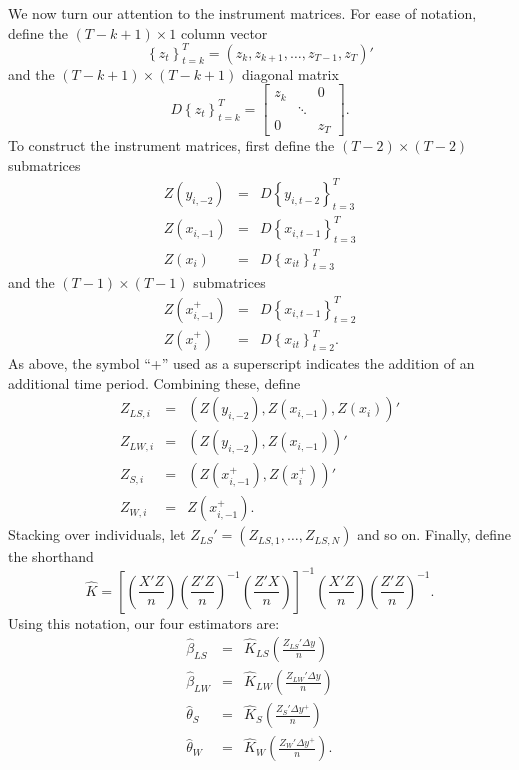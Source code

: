 We now turn our attention to the instrument matrices. For ease of notation, define the $(T-k+1)\times 1$ column vector
	\begin{equation}
		\left\{ z_t\right\}_{t=k}^{T} = \left(z_k, z_{k+1}, \hdots, z_{T-1}, z_T \right)'
	\end{equation}
and the $(T-k+1)\times (T-k+1)$ diagonal matrix
\begin{equation}
		D\left\{ z_t \right\}_{t=k}^{T} = \left[\begin{array}{ccc} z_{k} & & 0\\ &\ddots&\\ 0 &&z_T \end{array}\right].
\end{equation}
To construct the instrument matrices, first define the $(T-2)\times(T-2)$ submatrices
\begin{eqnarray}
	Z(y_{i,-2}) &=& D\left\{ y_{i,t-2} \right\}_{t=3}^{T}\\
	Z(x_{i,-1}) &=& D\left\{ x_{i,t-1} \right\}_{t=3}^{T}\\
	\label{eq:Zx}
		Z(x_i) &=& D\left\{x_{it}  \right\}_{t=3}^{T}
 \end{eqnarray}
and the $(T-1)\times(T-1)$ submatrices
\begin{eqnarray}
	Z(x_{i,-1}^+) &=&D\left\{ x_{i,t-1} \right\}_{t=2}^{T}\\
		Z(x_i^+) &=& D\left\{x_{it}  \right\}_{t=2}^{T}.
 \end{eqnarray}
As above, the symbol ``+'' used as a superscript indicates the addition of an additional time period. 
Combining these, define 
	\begin{eqnarray}
	Z_{LS,i} &=& \left(Z(y_{i,-2}), Z(x_{i,-1}), Z(x_i)  \right)'\\
	Z_{LW,i} &=&  \left(Z(y_{i,-2}), Z(x_{i,-1}) \right)'\\
	Z_{S,i} &=& \left(Z(x_{i,-1}^+), Z(x_i^+) \right)'\\
	Z_{W,i} &=& Z(x_{i,-1}^+).
	\end{eqnarray}
Stacking over individuals, let $Z_{LS}' = \left(Z_{LS,1}, \hdots,  Z_{LS,N}\right)$ and so on. 
Finally, define the shorthand
\begin{equation}
\label{eq:K}
	\widehat{K} = \left[\left(\frac{X'Z}{n}\right)\left(\frac{Z'Z}{n}\right)^{-1}\left(\frac{Z'X}{n}\right)\right]^{-1}\left(\frac{X'Z}{n}\right)\left(\frac{Z'Z}{n}\right)^{-1}.
\end{equation}
Using this notation, our four estimators are:
\begin{eqnarray}
	\widehat{\beta}_{LS} &=&  \widehat{K}_{LS}\left(\frac{Z_{LS}'\Delta y}{n}\right)\\
	\widehat{\beta}_{LW} &=& \widehat{K}_{LW}\left(\frac{Z_{LW}'\Delta y}{n}\right)\\
	\widehat{\theta}_{S} &=&  \widehat{K}_S\left(\frac{Z_{S}'\Delta y^+}{n}\right)\\
	\widehat{\theta}_{W} &=&  \widehat{K}_W\left(\frac{Z_{W}'\Delta y^+}{n}\right).
\end{eqnarray}
